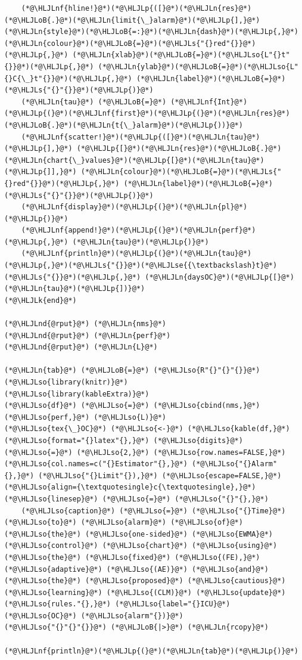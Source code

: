 \documentclass[12pt,a4paper]{article}
\newcommand{\HLJLk}[1]{\textcolor[RGB]{148,91,176}{\textbf{#1}}}
\newcommand{\HLJLn}[1]{#1}
\newcommand{\HLJLnd}[1]{\textcolor[RGB]{214,102,97}{#1}}
\newcommand{\HLJLnf}[1]{\textcolor[RGB]{66,102,213}{#1}}
\newcommand{\HLJLs}[1]{\textcolor[RGB]{201,61,57}{#1}}
\newcommand{\HLJLse}[1]{\textcolor[RGB]{59,151,46}{#1}}
\newcommand{\HLJLso}[1]{\textcolor[RGB]{201,61,57}{#1}}
\newcommand{\HLJLoB}[1]{\textcolor[RGB]{102,102,102}{\textbf{#1}}}
\newcommand{\HLJLp}[1]{#1}
\begin{document}
\begin{lstlisting}
    (*@\HLJLnf{hline!}@*)(*@\HLJLp{([}@*)(*@\HLJLn{res}@*)(*@\HLJLoB{.}@*)(*@\HLJLn{limit{\_}alarm}@*)(*@\HLJLp{],}@*) (*@\HLJLn{style}@*)(*@\HLJLoB{=:}@*)(*@\HLJLn{dash}@*)(*@\HLJLp{,}@*) (*@\HLJLn{colour}@*)(*@\HLJLoB{=}@*)(*@\HLJLs{"{}red"{}}@*)(*@\HLJLp{,}@*) (*@\HLJLn{xlab}@*)(*@\HLJLoB{=}@*)(*@\HLJLso{L"{}t"{}}@*)(*@\HLJLp{,}@*) (*@\HLJLn{ylab}@*)(*@\HLJLoB{=}@*)(*@\HLJLso{L"{}C{\_}t"{}}@*)(*@\HLJLp{,}@*) (*@\HLJLn{label}@*)(*@\HLJLoB{=}@*)(*@\HLJLs{"{}"{}}@*)(*@\HLJLp{)}@*)
    (*@\HLJLn{tau}@*) (*@\HLJLoB{=}@*) (*@\HLJLnf{Int}@*)(*@\HLJLp{(}@*)(*@\HLJLnf{first}@*)(*@\HLJLp{(}@*)(*@\HLJLn{res}@*)(*@\HLJLoB{.}@*)(*@\HLJLn{t{\_}alarm}@*)(*@\HLJLp{))}@*)
    (*@\HLJLnf{scatter!}@*)(*@\HLJLp{([}@*)(*@\HLJLn{tau}@*)(*@\HLJLp{],}@*) (*@\HLJLp{[}@*)(*@\HLJLn{res}@*)(*@\HLJLoB{.}@*)(*@\HLJLn{chart{\_}values}@*)(*@\HLJLp{[}@*)(*@\HLJLn{tau}@*)(*@\HLJLp{]],}@*) (*@\HLJLn{colour}@*)(*@\HLJLoB{=}@*)(*@\HLJLs{"{}red"{}}@*)(*@\HLJLp{,}@*) (*@\HLJLn{label}@*)(*@\HLJLoB{=}@*)(*@\HLJLs{"{}"{}}@*)(*@\HLJLp{)}@*)
    (*@\HLJLnf{display}@*)(*@\HLJLp{(}@*)(*@\HLJLn{pl}@*)(*@\HLJLp{)}@*)
    (*@\HLJLnf{append!}@*)(*@\HLJLp{(}@*)(*@\HLJLn{perf}@*)(*@\HLJLp{,}@*) (*@\HLJLn{tau}@*)(*@\HLJLp{)}@*)
    (*@\HLJLnf{println}@*)(*@\HLJLp{(}@*)(*@\HLJLn{tau}@*)(*@\HLJLp{,}@*)(*@\HLJLs{"{}}@*)(*@\HLJLse{{\textbackslash}t}@*)(*@\HLJLs{"{}}@*)(*@\HLJLp{,}@*) (*@\HLJLn{daysOC}@*)(*@\HLJLp{[}@*)(*@\HLJLn{tau}@*)(*@\HLJLp{])}@*)
(*@\HLJLk{end}@*)

(*@\HLJLnd{@rput}@*) (*@\HLJLn{nms}@*)
(*@\HLJLnd{@rput}@*) (*@\HLJLn{perf}@*)
(*@\HLJLnd{@rput}@*) (*@\HLJLn{L}@*)

(*@\HLJLn{tab}@*) (*@\HLJLoB{=}@*) (*@\HLJLso{R"{}"{}"{}}@*)
(*@\HLJLso{library(knitr)}@*)
(*@\HLJLso{library(kableExtra)}@*)
(*@\HLJLso{df}@*) (*@\HLJLso{=}@*) (*@\HLJLso{cbind(nms,}@*) (*@\HLJLso{perf,}@*) (*@\HLJLso{L)}@*)
(*@\HLJLso{tex{\_}OC}@*) (*@\HLJLso{<-}@*) (*@\HLJLso{kable(df,}@*) (*@\HLJLso{format="{}latex"{},}@*) (*@\HLJLso{digits}@*) (*@\HLJLso{=}@*) (*@\HLJLso{2,}@*) (*@\HLJLso{row.names=FALSE,}@*) (*@\HLJLso{col.names=c("{}Estimator"{},}@*) (*@\HLJLso{"{}Alarm"{},}@*) (*@\HLJLso{"{}Limit"{}),}@*) (*@\HLJLso{escape=FALSE,}@*) (*@\HLJLso{align={\textquotesingle}c{\textquotesingle},}@*) (*@\HLJLso{linesep}@*) (*@\HLJLso{=}@*) (*@\HLJLso{"{}"{},}@*)
    (*@\HLJLso{caption}@*) (*@\HLJLso{=}@*) (*@\HLJLso{"{}Time}@*) (*@\HLJLso{to}@*) (*@\HLJLso{alarm}@*) (*@\HLJLso{of}@*) (*@\HLJLso{the}@*) (*@\HLJLso{one-sided}@*) (*@\HLJLso{EWMA}@*) (*@\HLJLso{control}@*) (*@\HLJLso{chart}@*) (*@\HLJLso{using}@*) (*@\HLJLso{the}@*) (*@\HLJLso{fixed}@*) (*@\HLJLso{(FE),}@*) (*@\HLJLso{adaptive}@*) (*@\HLJLso{(AE)}@*) (*@\HLJLso{and}@*) (*@\HLJLso{the}@*) (*@\HLJLso{proposed}@*) (*@\HLJLso{cautious}@*) (*@\HLJLso{learning}@*) (*@\HLJLso{(CLM)}@*) (*@\HLJLso{update}@*) (*@\HLJLso{rules."{},}@*) (*@\HLJLso{label="{}ICU}@*) (*@\HLJLso{OC}@*) (*@\HLJLso{alarm"{})}@*)
(*@\HLJLso{"{}"{}"{}}@*) (*@\HLJLoB{|>}@*) (*@\HLJLn{rcopy}@*)

(*@\HLJLnf{println}@*)(*@\HLJLp{(}@*)(*@\HLJLn{tab}@*)(*@\HLJLp{)}@*)
\end{lstlisting}
\end{document}
